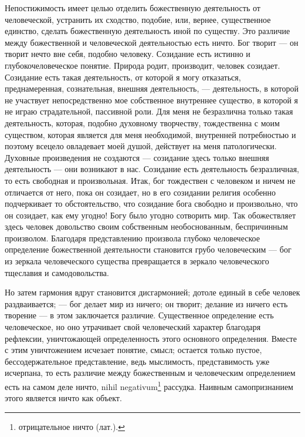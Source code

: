 \documentclass[12pt,oneside]{book}
\begin{document}
Непостижимость имеет целью отделить божественную деятельность от человеческой, устранить их сходство, подобие, или, вернее, существенное единство, сделать божественную деятельность иной по существу. Это различие между божественной и человеческой деятельностью есть ничто. Бог творит --- он творит нечто вне себя, подобно человеку. Созидание есть истинно и глубокочеловеческое понятие. Природа родит, производит, человек созидает. Созидание есть такая деятельность, от которой я могу отказаться, преднамеренная, сознательная, внешняя деятельность, --- деятельность, в которой не участвует непосредственно мое собственное внутреннее существо, в которой я не играю страдательной, пассивной роли. Для меня не безразлична только такая деятельность, которая, подобно духовному творчеству, тождественна с моим существом, которая является для меня необходимой, внутренней потребностью и поэтому всецело овладевает моей душой, действует на меня патологически. Духовные произведения не создаются --- созидание здесь только внешняя деятельность --- они возникают в нас\dag\let\svthefootnote\thefootnote\let\thefootnote\relax{}\let\thefootnote\svthefootnote. Созидание есть деятельность безразличная, то есть свободная и произвольная. Итак, бог тождествен с человеком и ничем не отличается от него, пока он созидает, но в его созидании религия особенно подчеркивает то обстоятельство, что созидание бога свободно и произвольно, что он созидает, как ему угодно! Богу было угодно сотворить мир. Так обожествляет здесь человек довольство своим собственным необоснованным, беспричинным произволом. Благодаря представлению произвола глубоко человеческое определение божественной деятельности становится грубо человеческим --- бог из зеркала человеческого существа превращается в зеркало человеческого тщеславия и самодовольства.



Но затем гармония вдруг становится дисгармонией; дотоле единый в себе человек раздваивается; --- бог делает мир из ничего; он творит; делание из ничего есть творение --- в этом заключается различие. Существенное определение есть человеческое, но оно утрачивает свой человеческий характер благодаря рефлексии, уничтожающей определенность этого основного определения. Вместе с этим уничтожением исчезает понятие, смысл; остается только пустое, бессодержательное представление, ведь мыслимость, представимость уже исчерпана, то есть различие между божественным и человеческим определением есть на самом деле ничто, nihil negativum\footnote{отрицательное ничто (лат.).} рассудка. Наивным самопризнанием этого является ничто как объект.
\end{document}
